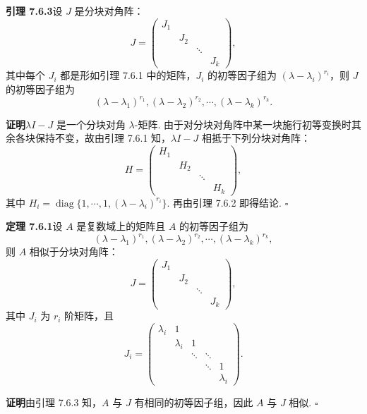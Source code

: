 \documentclass[UTF8, 12pt, fontset=fandol, oneside]{ctexart}
\begin{document}
\noindent\textbf{引理 7.6.3}\quad 设 $J$ 是分块对角阵：
\[
J=\left(\begin{array}{cccc}
J_1 & & & \\
& J_2 & & \\
& & \ddots & \\
& & & J_k
\end{array}\right),
\]
其中每个 $J_i$ 都是形如引理 7.6.1 中的矩阵，$J_i$ 的初等因子组为 $(\lambda-\lambda_i)^{r_i}$，则 $J$ 的初等因子组为
\begin{equation}
(\lambda-\lambda_1)^{r_1},(\lambda-\lambda_2)^{r_2},\cdots,(\lambda-\lambda_k)^{r_k}.
\tag{7.6.3}
\end{equation}

\noindent\textbf{证明}\quad $\lambda I-J$ 是一个分块对角 $\lambda$-矩阵. 由于对分块对角阵中某一块施行初等变换时其余各块保持不变，故由引理 7.6.1 知，$\lambda I-J$ 相抵于下列分块对角阵：
\[
H=\left(\begin{array}{cccc}
H_1 & & & \\
& H_2 & & \\
& & \ddots & \\
& & & H_k
\end{array}\right),
\]
其中 $H_i=\operatorname{diag}\{1,\cdots,1,(\lambda-\lambda_i)^{r_i}\}$. 再由引理 7.6.2 即得结论. $\square$

\noindent\textbf{定理 7.6.1}\quad 设 $A$ 是复数域上的矩阵且 $A$ 的初等因子组为
\[
(\lambda-\lambda_1)^{r_1},(\lambda-\lambda_2)^{r_2},\cdots,(\lambda-\lambda_k)^{r_k},
\]
则 $A$ 相似于分块对角阵：
\begin{equation}
J=\left(\begin{array}{cccc}
J_1 & & & \\
& J_2 & & \\
& & \ddots & \\
& & & J_k
\end{array}\right),
\tag{7.6.4}
\end{equation}
其中 $J_i$ 为 $r_i$ 阶矩阵，且
\begin{equation}
J_i=\left(\begin{array}{ccccc}
\lambda_i & 1 & & & \\
& \lambda_i & 1 & & \\
& & \ddots & \ddots & \\
& & & \ddots & 1\\
& & & & \lambda_i
\end{array}\right).
\tag{7.6.5}
\end{equation}

\noindent\textbf{证明}\quad 由引理 7.6.3 知，$A$ 与 $J$ 有相同的初等因子组，因此 $A$ 与 $J$ 相似. $\square$
\end{document}

